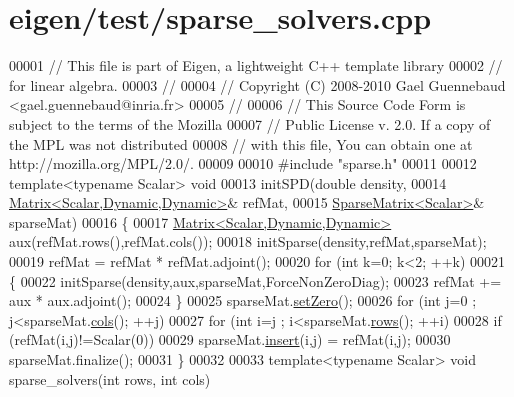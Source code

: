 \hypertarget{eigen_2test_2sparse__solvers_8cpp_source}{}\section{eigen/test/sparse\+\_\+solvers.cpp}
\label{eigen_2test_2sparse__solvers_8cpp_source}

\begin{DoxyCode}
00001 \textcolor{comment}{// This file is part of Eigen, a lightweight C++ template library}
00002 \textcolor{comment}{// for linear algebra.}
00003 \textcolor{comment}{//}
00004 \textcolor{comment}{// Copyright (C) 2008-2010 Gael Guennebaud <gael.guennebaud@inria.fr>}
00005 \textcolor{comment}{//}
00006 \textcolor{comment}{// This Source Code Form is subject to the terms of the Mozilla}
00007 \textcolor{comment}{// Public License v. 2.0. If a copy of the MPL was not distributed}
00008 \textcolor{comment}{// with this file, You can obtain one at http://mozilla.org/MPL/2.0/.}
00009 
00010 \textcolor{preprocessor}{#include "sparse.h"}
00011 
00012 \textcolor{keyword}{template}<\textcolor{keyword}{typename} Scalar> \textcolor{keywordtype}{void}
00013 initSPD(\textcolor{keywordtype}{double} density,
00014         \hyperlink{group___core___module}{Matrix<Scalar,Dynamic,Dynamic>}& refMat,
00015         \hyperlink{group___sparse_core___module}{SparseMatrix<Scalar>}& sparseMat)
00016 \{
00017   \hyperlink{group___core___module}{Matrix<Scalar,Dynamic,Dynamic>} aux(refMat.rows(),refMat.cols());
00018   initSparse(density,refMat,sparseMat);
00019   refMat = refMat * refMat.adjoint();
00020   \textcolor{keywordflow}{for} (\textcolor{keywordtype}{int} k=0; k<2; ++k)
00021   \{
00022     initSparse(density,aux,sparseMat,ForceNonZeroDiag);
00023     refMat += aux * aux.adjoint();
00024   \}
00025   sparseMat.\hyperlink{group___sparse_core___module_ad3c7416090f913e8685523cb3ab7c2f7}{setZero}();
00026   \textcolor{keywordflow}{for} (\textcolor{keywordtype}{int} j=0 ; j<sparseMat.\hyperlink{group___sparse_core___module_aa391750e3c530227e4a5c3c52e959975}{cols}(); ++j)
00027     \textcolor{keywordflow}{for} (\textcolor{keywordtype}{int} i=j ; i<sparseMat.\hyperlink{group___sparse_core___module_a62e61bb861eee306d5b069ce652b5aa5}{rows}(); ++i)
00028       \textcolor{keywordflow}{if} (refMat(i,j)!=Scalar(0))
00029         sparseMat.\hyperlink{group___sparse_core___module_aae45e3b5fec7f6a0cdd10eec7c6d3666}{insert}(i,j) = refMat(i,j);
00030   sparseMat.finalize();
00031 \}
00032 
00033 \textcolor{keyword}{template}<\textcolor{keyword}{typename} Scalar> \textcolor{keywordtype}{void} sparse\_solvers(\textcolor{keywordtype}{int} rows, \textcolor{keywordtype}{int} cols)

\end{DoxyCode}
